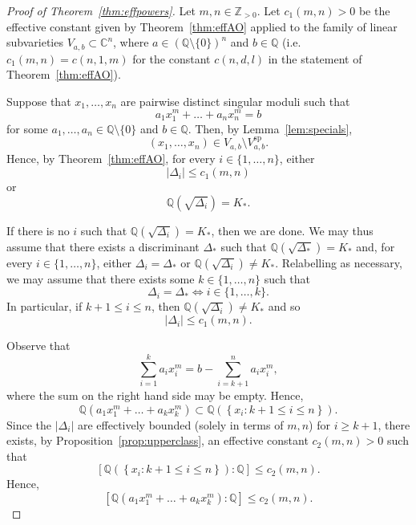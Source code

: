 \documentclass[11pt,a4paper, british]{amsart}
\theoremstyle{definition}
\theoremstyle{remark}
\numberwithin{equation}{section}
\newcommand{\Q}{\mathbb{Q}} %
\newcommand{\Z}{\mathbb{Z}} %
\newcommand{\C}{\mathbb{C}} %
\begin{document}
\begin{proof}[Proof of Theorem~\ref{thm:effpowers}]
	Let $m, n \in \Z_{>0}$. Let $c_1(m, n)>0$ be the effective constant given by Theorem~\ref{thm:effAO} applied to the family of linear subvarieties $V_{a, b} \subset \C^n$, where $a \in (\Q \setminus \{0\})^n$ and $b \in \Q$ (i.e. $c_1(m, n) = c(n, 1, m)$ for the constant $c(n, d, l)$ in the statement of Theorem~\ref{thm:effAO}).
	
	Suppose that $x_1, \ldots, x_n$ are pairwise distinct singular moduli such that
	\[ a_1 x_1^m + \ldots + a_n x_n^m = b\]
	for some $a_1, \ldots, a_n \in \Q \setminus \{0\}$ and $b \in \Q$. Then, by Lemma~\ref{lem:specials},
	\[(x_1, \ldots, x_n) \in V_{a, b} \setminus V_{a, b}^\mathrm{sp}.\]
	Hence, by Theorem~\ref{thm:effAO}, for every $i \in \{1, \ldots, n\}$, either
	\[ \lvert \Delta_i \rvert \leq c_1(m, n)\]
	or
	\[ \Q\left(\sqrt{\Delta_i}\right) = K_*.\]
	
	If there is no $i$ such that $\Q(\sqrt{\Delta_i}) = K_*$, then we are done. We may thus assume that there exists a discriminant $\Delta_*$ such that $\Q(\sqrt{\Delta_*}) = K_*$ and, for every $i \in \{1, \ldots, n\}$, either $\Delta_i = \Delta_*$ or $\Q(\sqrt{\Delta_i}) \neq K_*$.
	Relabelling as necessary, we may assume that 
	there exists some $k \in \{1, \ldots, n\}$ such that
	\[ \Delta_i = \Delta_* \iff i \in \{1, \ldots, k\}.\]
	In particular, if $k+1 \leq i \leq n$, then $\Q(\sqrt{\Delta_i}) \neq K_*$ and so
	\[ \lvert \Delta_i \rvert \leq c_1(m, n).\]
	
	Observe that
	\[ \sum_{i=1}^k a_i x_i^m = b - \sum_{i = k+1}^n a_i x_i^m,\]
	where the sum on the right hand side may be empty. Hence,
	\[ \Q\left(a_1 x_1^m + \ldots + a_k x_k^m \right) \subset \Q\left(\left\{x_i : k+1 \leq i \leq n\right\}\right).\]
	Since the $\lvert \Delta_i \rvert$ are effectively bounded (solely in terms of $m, n$) for $i \geq k+1$, there exists, by Proposition~\ref{prop:upperclass}, an effective constant $c_2(m, n)>0$ such that
	\[ \left[ \Q\left(\left\{x_i : k+1 \leq i \leq n\right\}\right): \Q\right] \leq c_2(m, n).\]
	Hence,
	\[ \left [\Q\left(a_1 x_1^m + \ldots + a_k x_k^m \right) : \Q \right] \leq c_2(m, n).\]
	

\end{proof}
\end{document}
